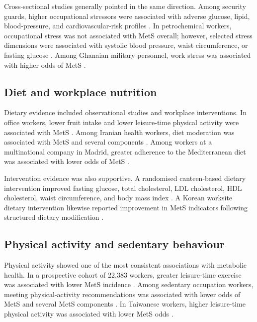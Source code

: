 \documentclass[11pt]{article}
\begin{document}
Cross-sectional studies generally pointed in the same direction. Among security guards, higher occupational stressors were associated with adverse glucose, lipid, blood-pressure, and cardiovascular-risk profiles \citep{Jovanovic2020}. In petrochemical workers, occupational stress was not associated with MetS overall; however, selected stress dimensions were associated with systolic blood pressure, waist circumference, or fasting glucose \citep{Zhang2024}. Among Ghanaian military personnel, work stress was associated with higher odds of MetS \citep{Ayeltigah2026Military}.

\subsection{Diet and workplace nutrition}

Dietary evidence included observational studies and workplace interventions. In office workers, lower fruit intake and lower leisure-time physical activity were associated with MetS \citep{Alavi2015}. Among Iranian health workers, diet moderation was associated with MetS and several components \citep{Sharifi2025}. Among workers at a multinational company in Madrid, greater adherence to the Mediterranean diet was associated with lower odds of MetS \citep{ReinosoBarbero2026}.

Intervention evidence was also supportive. A randomised canteen-based dietary intervention improved fasting glucose, total cholesterol, LDL cholesterol, HDL cholesterol, waist circumference, and body mass index \citep{Ma2025}. A Korean worksite dietary intervention likewise reported improvement in MetS indicators following structured dietary modification \citep{Kim2016Dietary}.

\subsection{Physical activity and sedentary behaviour}

Physical activity showed one of the most consistent associations with metabolic health. In a prospective cohort of 22,383 workers, greater leisure-time exercise was associated with lower MetS incidence \citep{Kuwahara2016}. Among sedentary occupation workers, meeting physical-activity recommendations was associated with lower odds of MetS and several MetS components \citep{Browne2017}. In Taiwanese workers, higher leisure-time physical activity was associated with lower MetS odds \citep{Huang2017Taiwan}.
\end{document}
